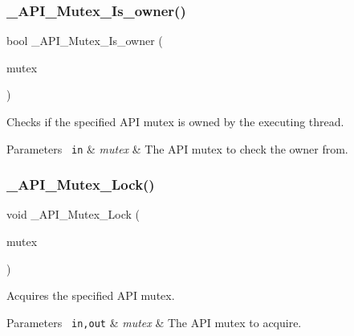 \subsubsection{\texorpdfstring{\_API\_Mutex\_Is\_owner()}{\_API\_Mutex\_Is\_owner()}}
{\footnotesize\ttfamily bool \+\_\+\+A\+P\+I\+\_\+\+Mutex\+\_\+\+Is\+\_\+owner (\begin{DoxyParamCaption}\item[{const \mbox{\hyperlink{structAPI__Mutex__Control}{A\+P\+I\+\_\+\+Mutex\+\_\+\+Control}} $\ast$}]{mutex }\end{DoxyParamCaption})}



Checks if the specified A\+PI mutex is owned by the executing thread. 


\begin{DoxyParams}[1]{Parameters}
\mbox{\texttt{ in}}  & {\em mutex} & The A\+PI mutex to check the owner from. \\
\hline
\end{DoxyParams}
\mbox{\label{group__RTEMSScoreAPIMutex_ga57829ca494f1d866219c499eadb0ffc9}} 
\subsubsection{\texorpdfstring{\_API\_Mutex\_Lock()}{\_API\_Mutex\_Lock()}}
{\footnotesize\ttfamily void \+\_\+\+A\+P\+I\+\_\+\+Mutex\+\_\+\+Lock (\begin{DoxyParamCaption}\item[{\mbox{\hyperlink{structAPI__Mutex__Control}{A\+P\+I\+\_\+\+Mutex\+\_\+\+Control}} $\ast$}]{mutex }\end{DoxyParamCaption})}



Acquires the specified A\+PI mutex. 


\begin{DoxyParams}[1]{Parameters}
\mbox{\texttt{ in,out}}  & {\em mutex} & The A\+PI mutex to acquire. \\
\hline
\end{DoxyParams}
\mbox{\label{group__RTEMSScoreAPIMutex_ga64a430ae861d0ce7f63413e651fbe36d}} 
